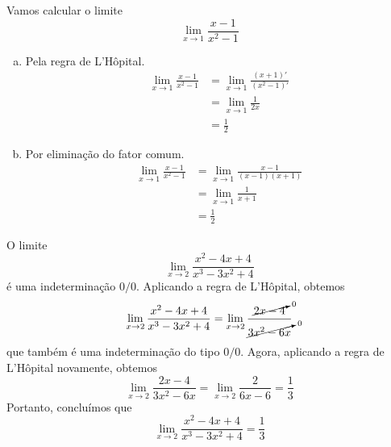 \cleardoublepage\documentclass[../main.tex]{subfiles}
\begin{document}
\begin{ex}
  Vamos calcular o limite
  \begin{equation*}
    \lim_{x\to 1} \frac{x-1}{x^2-1}
  \end{equation*}
  \begin{enumerate}[a)]
  \item Pela regra de L'Hôpital.
    \begin{align*}
      \lim_{x\to 1} \frac{x-1}{x^2-1} &= \lim_{x\to 1} \frac{(x+1)'}{(x^2-1)'} \\
                                      &= \lim_{x\to 1} \frac{1}{2x} \\
                                      &= \frac{1}{2}
    \end{align*}
  \item Por eliminação do fator comum.
    \begin{align*}
      \lim_{x\to 1} \frac{x-1}{x^2-1} &= \lim_{x\to 1} \frac{x-1}{(x-1)(x+1)} \\
                                      &= \lim_{x\to 1} \frac{1}{x+1} \\
                                      &= \frac{1}{2}
    \end{align*}
  \end{enumerate}
 \end{ex}

\begin{ex}
  O limite
  \begin{equation}
    \lim_{x\to 2} \frac{x^2-4x+4}{x^3-3x^2+4}
  \end{equation}
  é uma indeterminação $0/0$. Aplicando a regra de L'Hôpital, obtemos
  \begin{equation*}
    \lim_{x\to 2} \frac{x^2-4x+4}{x^3-3x^2+4} = \lim_{x\to 2} \frac{\cancelto{0}{2x-4}}{\cancelto{0}{3x^2-6x}}
  \end{equation*}
  que também é uma indeterminação do tipo $0/0$. Agora, aplicando a regra de L'Hôpital novamente, obtemos
  \begin{equation*}
    \lim_{x\to 2} \frac{2x-4}{3x^2-6x} = \lim_{x\to 2} \frac{2}{6x-6} = \frac{1}{3}
  \end{equation*}
  Portanto, concluímos que
  \begin{equation*}
    \lim_{x\to 2} \frac{x^2-4x+4}{x^3-3x^2+4} = \frac{1}{3}
  \end{equation*}  
\end{ex}
\end{document}
